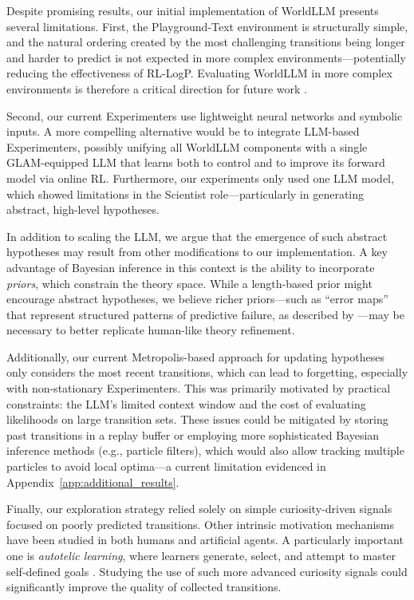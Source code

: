 \documentclass{article}
\begin{document}
Despite promising results, our initial implementation of WorldLLM presents several limitations. First, the Playground-Text environment is structurally simple, and the natural ordering created by the most challenging transitions being longer and harder to predict is not expected in more complex environments—potentially reducing the effectiveness of RL-LogP. Evaluating WorldLLM in more complex environments is therefore a critical direction for future work \citep{ying_assessing_2025}.

Second, our current Experimenters use lightweight neural networks and symbolic inputs. A more compelling alternative would be to integrate LLM-based Experimenters, possibly unifying all WorldLLM components with a single GLAM-equipped LLM that learns both to control and to improve its forward model via online RL. Furthermore, our experiments only used one LLM model, which showed limitations in the Scientist role—particularly in generating abstract, high-level hypotheses. 

In addition to scaling the LLM, we argue that the emergence of such abstract hypotheses may result from other modifications to our implementation. A key advantage of Bayesian inference in this context is the ability to incorporate \textit{priors}, which constrain the theory space. While a length-based prior might encourage abstract hypotheses, we believe richer priors—such as “error maps” that represent structured patterns of predictive failure, as described by \citet{schulz_chapter_2012}—may be necessary to better replicate human-like theory refinement.

Additionally, our current Metropolis-based approach for updating hypotheses only considers the most recent transitions, which can lead to forgetting, especially with non-stationary Experimenters. This was primarily motivated by practical constraints: the LLM's limited context window and the cost of evaluating likelihoods on large transition sets. These issues could be mitigated by storing past transitions in a replay buffer or employing more sophisticated Bayesian inference methods (e.g., particle filters), which would also allow tracking multiple particles to avoid local optima—a current limitation evidenced in Appendix~\ref{app:additional_results}.

Finally, our exploration strategy relied solely on simple curiosity-driven signals focused on poorly predicted transitions. Other intrinsic motivation mechanisms have been studied in both humans and artificial agents. A particularly important one is \textit{autotelic learning}, where learners generate, select, and attempt to master self-defined goals \citep{steels_autotelic_2004, colas_autotelic_2022}. Studying the use of such more advanced curiosity signals could significantly improve the quality of collected transitions.
\end{document}
